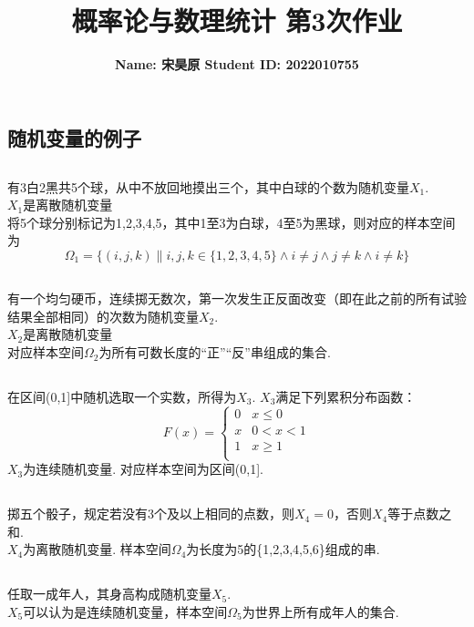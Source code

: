 \documentclass{article}
\title{\bf\Large  概率论与数理统计 第3次作业}
\author{\bf Name: 宋昊原 \qquad Student ID: 2022010755}
\begin{document}
\begin{CJK}{UTF8}{gbsn}
\maketitle
\section{随机变量的例子}
\subsection{}
有3白2黑共5个球，从中不放回地摸出三个，其中白球的个数为随机变量$X_{1}$.
\\$X_{1}$是离散随机变量
\\将5个球分别标记为1,2,3,4,5，其中1至3为白球，4至5为黑球，则对应的样本空间为
$$ \Omega_{1}=\{(i,j,k)\|i,j,k\in\{1,2,3,4,5\}\land i\neq j \land j\neq k \land i\neq k \} $$
\subsection{}
有一个均匀硬币，连续掷无数次，第一次发生正反面改变（即在此之前的所有试验结果全部相同）的次数为随机变量$X_{2}$.
\\$X_{2}$是离散随机变量
\\对应样本空间$\Omega_{2}$为所有可数长度的“正”“反”串组成的集合.
\subsection{}
在区间(0,1]中随机选取一个实数，所得为$X_{3}$.
$X_{3}$满足下列累积分布函数：
\begin{equation}
    F(x)=\left\{
    \begin{array}{cl}
    0  &  x\leq 0\\
    x & 0<x<1\\
    1  &  x\geq 1\\
    \end{array}\right.
\end{equation}
$X_{3}$为连续随机变量. 对应样本空间为区间(0,1].
\subsection{}
掷五个骰子，规定若没有3个及以上相同的点数，则$X_{4}=0$，否则$X_{4}$等于点数之和.
\\$X_{4}$为离散随机变量. 样本空间$\Omega_{4}$为长度为5的\{1,2,3,4,5,6\}组成的串.
\subsection{}
任取一成年人，其身高构成随机变量$X_{5}$.
\\$X_{5}$可以认为是连续随机变量，样本空间$\Omega_{5}$为世界上所有成年人的集合.

\end{CJK}
\end{document}
